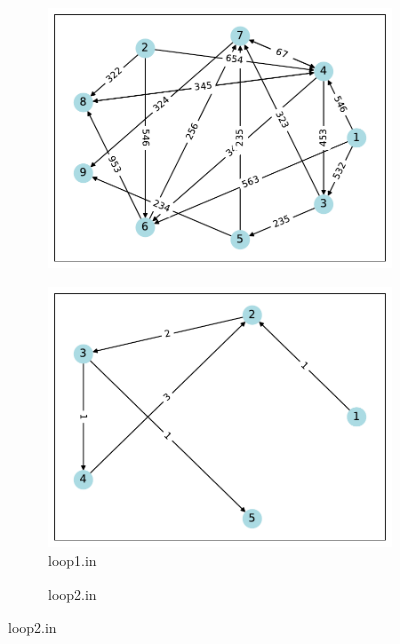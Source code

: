 \documentclass[a4paper,oneside]{book}
\begin{document}
\begin{figure}[!ht]
\begin{subfigure}[b]{0.3\textwidth}
        \includegraphics[width=\textwidth]{src/3.pdf}
    \end{subfigure}
    \begin{subfigure}[b]{0.3\textwidth}
        \centering
        \caption{loop1.in}
        \includegraphics[width=\textwidth]{src/loop1.pdf}
    \end{subfigure}
    \begin{subfigure}[b]{0.3\textwidth}
        \centering
        \caption{loop2.in}

\end{subfigure}
\end{figure}
\end{document}
